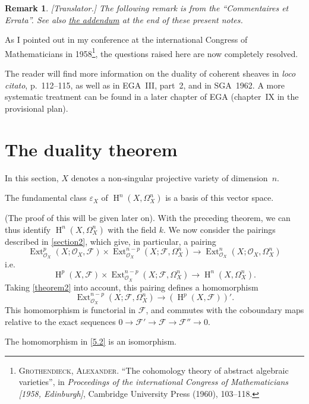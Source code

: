\documentclass{article}
\theoremstyle{plain}
\newenvironment{theorem}[1]
  {\renewcommand\theinnercustomtheorem{#1}\innercustomtheorem}
  {\endinnercustomtheorem}
\theoremstyle{definition}
\newtheorem*{remark}{Remark}
\newcommand{\sh}{\mathscr}
\DeclareMathOperator{\Ext}{Ext}
\DeclareMathOperator{\HH}{H}
\newcommand{\oldpage}[1]{\marginpar{\footnotesize$\Big\vert$ \textit{p.~#1}}}
\begin{document}
\begin{remark}
  \emph{[Translator.] The following remark is from the ``Commentaires et Errata''. See also \hyperref[addendum]{the addendum} at the end of these present notes.}

  As I pointed out in my conference at the international Congress of Mathematicians in 1958\footnote{\textsc{Grothendieck, Alexander.} ``The cohomology theory of abstract algebraic varieties'', in \emph{Proceedings of the international Congress of Mathematicians [1958, Edinburgh]}, Cambridge University Press (1960), 103--118.}, the questions raised here are now completely resolved.

  The reader will find more information on the duality of coherent sheaves in \emph{loco citato}, p.~112--115, as well as in EGA~III, part~2, and in SGA~1962.
  A more systematic treatment can be found in a later chapter of EGA (chapter~IX in the provisional plan).
\end{remark}


\section{The duality theorem}
\label{section5}

In this section, $X$ denotes a non-singular projective variety of dimension~$n$.

\begin{theorem}{2}
\label{theorem2}
  The fundamental class $\varepsilon_X$ of $\HH^n(X,\Omega_X^n)$ is a basis of this vector space.
\end{theorem}

(The proof of this will be given later on).
With the preceding theorem, we can thus identify $\HH^n(X,\Omega_X^n)$ with the field $k$.
We now consider the pairings described in \cref{section2}, which give, in particular, a pairing
\oldpage{149-14}
\[
  \Ext_{\sh{O}_X}^p(X;\sh{O}_X,\sh{F})\times\Ext_{\sh{O}_X}^{n-p}(X;\sh{F},\Omega_X^n) \to \Ext_{\sh{O}_X}^n(X;\sh{O}_X,\Omega_X^n)
\]
i.e.
\[
\label{5.1}
  \HH^p(X,\sh{F})\times\Ext_{\sh{O}_X}^{n-p}(X;\sh{F},\Omega_X^n) \to \HH^n(X,\Omega_X^n).
\tag{5.1}
\]
Taking \cref{theorem2} into account, this pairing defines a homomorphism
\[
\label{5.2}
  \Ext_{\sh{O}_X}^{n-p}(X;\sh{F},\Omega_X^n) \to (\HH^p(X,\sh{F}))'.
\tag{5.2}
\]
This homomorphism is functorial in $\sh{F}$, and commutes with the coboundary maps relative to the exact sequences $0\to\sh{F}'\to\sh{F}\to\sh{F}''\to0$.

\begin{theorem}{3}
\label{theorem3}
  The homomorphism in \cref{5.2} is an isomorphism.
\end{theorem}
\end{document}
